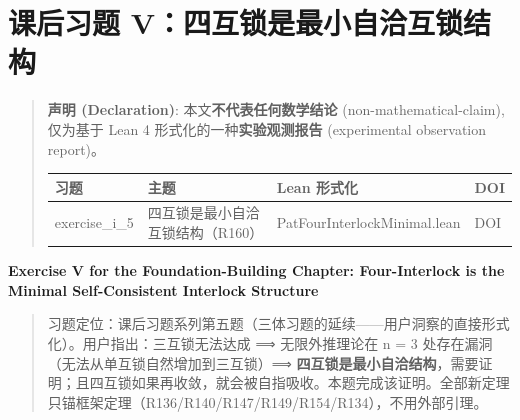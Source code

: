 \documentclass[
]{article}
\author{}
\date{}
\newcounter{none} %
\begin{document}
\section{课后习题
V：四互锁是最小自洽互锁结构}\label{ux7b51ux57faux7bc7ux8bfeux540eux4e60ux9898-vux56dbux4e92ux9501ux662fux6700ux5c0fux81eaux6d3dux4e92ux9501ux7ed3ux6784}

\begin{quote}
\textbf{声明 (Declaration)}: 本文\textbf{不代表任何数学结论}
(non-mathematical-claim), 仅为基于 Lean 4
形式化的一种\textbf{实验观测报告} (experimental observation report)。

{\def\LTcaptype{none} %
\begin{longtable}[]{@{}
 >{\raggedright\arraybackslash}p{}
 >{\raggedright\arraybackslash}p{}
 >{\raggedright\arraybackslash}p{}
 >{\raggedright\arraybackslash}p{}@{}}
\toprule\noalign{}
\begin{minipage}[b]{\linewidth}\raggedright
习题
\end{minipage} & \begin{minipage}[b]{\linewidth}\raggedright
主题
\end{minipage} & \begin{minipage}[b]{\linewidth}\raggedright
Lean 形式化
\end{minipage} & \begin{minipage}[b]{\linewidth}\raggedright
DOI
\end{minipage} \\
\midrule\noalign{}
\endhead
\bottomrule\noalign{}
\endlastfoot
exercise\_i\_5 & 四互锁是最小自洽互锁结构（R160） &
PatFourInterlockMinimal.lean & DOI \\
\end{longtable}
}
\end{quote}

\textbf{Exercise V for the Foundation-Building Chapter: Four-Interlock
is the Minimal Self-Consistent Interlock Structure}

\begin{quote}
习题定位：课后习题系列第五题（三体习题的延续------用户洞察的直接形式化）。用户指出：三互锁无法达成
⟹ 无限外推理论在 n = 3 处存在漏洞（无法从单互锁自然增加到三互锁）⟹
\textbf{四互锁是最小自洽结构}，需要证明；且四互锁如果再收敛，就会被自指吸收。本题完成该证明。全部新定理只锚框架定理（R136/R140/R147/R149/R154/R134），不用外部引理。
\end{quote}
\end{document}
